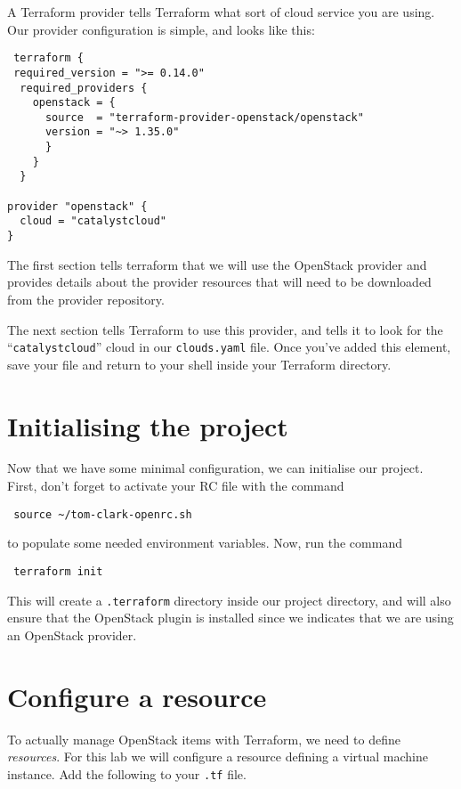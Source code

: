 \documentclass{article}
\begin{document}
A Terraform provider tells Terraform what sort of cloud service you are using. 
Our provider configuration is simple, and looks like this:

\begin{verbatim}
 terraform {
 required_version = ">= 0.14.0"
  required_providers {
    openstack = {
      source  = "terraform-provider-openstack/openstack"
      version = "~> 1.35.0"
      }
    }
  }

provider "openstack" {
  cloud = "catalystcloud"
}
\end{verbatim}
The first section tells terraform that we will use the OpenStack provider and provides details about the provider resources that will need to be downloaded from the provider repository.

The next section tells Terraform to use this provider, and 
tells it to look for the ``\texttt{catalystcloud}'' cloud in our \texttt{clouds.yaml} file.  Once you've added this element, 
save your file and return to your shell inside your Terraform directory.

\section{Initialising the project}
Now that we have some minimal configuration, we can initialise our project. First, don't forget to 
activate your RC file with the command

\begin{verbatim}
 source ~/tom-clark-openrc.sh
\end{verbatim}

to populate some needed environment variables. Now, run the command

\begin{verbatim}
 terraform init
\end{verbatim}

This will create a \texttt{.terraform} directory inside our project directory, and will also ensure that 
the OpenStack plugin is installed since we indicates that we are using an OpenStack provider.

\section{Configure a resource}
To actually manage OpenStack items with Terraform, we need to define \emph{resources}. For
this lab we will configure a resource defining a virtual machine instance. Add the following 
to your \texttt{.tf} file.
\end{document}
